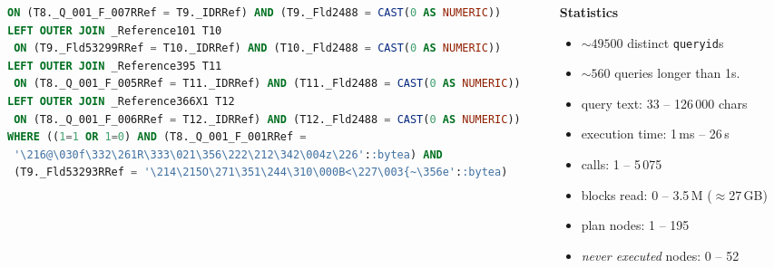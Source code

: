 \documentclass{beamer}
\begin{document}
\begin{frame}[fragile]
\begin{columns}[T]
\begin{column}{0.55\textwidth}
\begin{tcolorbox}[enhanced, sharp corners=downhill, arc=1pt,
  colback=paper, colframe=mailrule, boxrule=0.4pt,
  left=3pt, right=3pt, top=3pt, bottom=2pt,
  before skip=0pt, after skip=2pt]
\begin{lstlisting}[language=SQL, breaklines=true, columns=fixed,
  basicstyle=\ttfamily\fontsize{3.1}{3.5}\selectfont,
  keywordstyle=\ttfamily]
 ON (T8._Q_001_F_007RRef = T9._IDRRef) AND (T9._Fld2488 = CAST(0 AS NUMERIC))
LEFT OUTER JOIN _Reference101 T10
 ON (T9._Fld53299RRef = T10._IDRRef) AND (T10._Fld2488 = CAST(0 AS NUMERIC))
LEFT OUTER JOIN _Reference395 T11
 ON (T8._Q_001_F_005RRef = T11._IDRRef) AND (T11._Fld2488 = CAST(0 AS NUMERIC))
LEFT OUTER JOIN _Reference366X1 T12
 ON (T8._Q_001_F_006RRef = T12._IDRRef) AND (T12._Fld2488 = CAST(0 AS NUMERIC))
WHERE ((1=1 OR 1=0) AND (T8._Q_001_F_001RRef =
 '\216@\030f\332\261R\333\021\356\222\212\342\004z\226'::bytea) AND
 (T9._Fld53293RRef = '\214\215O\271\351\244\310\000B<\227\003{~\356e'::bytea)
\end{lstlisting}
\end{tcolorbox}
\end{column}

\begin{column}{0.45\textwidth}
\begin{center}
	{\scriptsize\textbf{Statistics}}
\end{center}
\par\vspace{2pt}
{\scriptsize
\begin{itemize}\itemsep2pt
 \item $\sim49500$ distinct \texttt{queryid}s
 \item $\sim560$ queries longer than 1s.
 \item query text: 33 -- 126\,000 chars
 \item execution time: 1\,ms -- 26\,s
 \item calls: 1 -- 5\,075
 \item blocks read: 0 -- 3.5\,M ($\approx$27\,GB)
 \item plan nodes: 1 -- 195
 \item \emph{never executed} nodes: 0 -- 52
\end{itemize}
}
\end{column}

\end{columns}
\end{frame}


\end{document}
